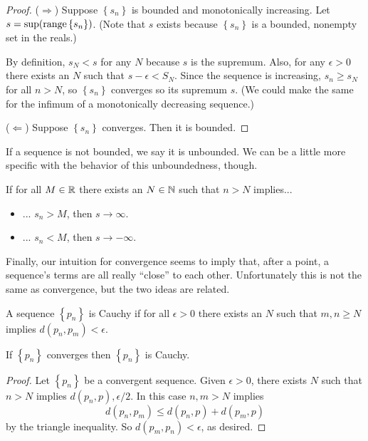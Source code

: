 \documentclass[../m131main.tex]{subfiles}
\begin{document}
\begin{proof}
    ($\Rightarrow$) Suppose $\left\{ s_n \right\}$ is bounded and monotonically increasing.
    Let $s = \sup (\operatorname{range} \left\{ s_n \right\})$.
    (Note that $s$ exists because $\left\{ s_n \right\}$ is a bounded, nonempty set in the reals.)

    By definition, $s_N < s$ for any $N$ because $s$ is the supremum.
    Also, for any $\epsilon > 0$ there exists an $N$ such that $s - \epsilon < S_N$.
    Since the sequence is increasing, $s_n \geq s_N$ for all $n > N$, so $\left\{ s_n \right\}$ converges so its supremum $s$.
    (We could make the same for the infimum of a monotonically decreasing sequence.)

    ($\Leftarrow$) Suppose $\left\{ s_n \right\}$ converges.
    Then it is bounded.
\end{proof}

If a sequence is not bounded, we say it is unbounded.
We can be a little more specific with the behavior of this unboundedness, though.

\begin{definition}
    If for all $M \in \mathbb{R}$ there exists an $N \in \mathbb{N}$ such that $n > N$ implies...
    \begin{itemize}
        \item ... $s_n > M$, then $s \to \infty$.
        \item ... $s_n < M$, then $s \to -\infty$.
    \end{itemize}
\end{definition}

Finally, our intuition for convergence seems to imply that, after a point, a sequence's terms are all really ``close'' to each other.
Unfortunately this is not the same as convergence, but the two ideas are related.

\begin{definition}
    A sequence $\left\{ p_n \right\}$ is Cauchy if for all $\epsilon > 0$ there exists an $N$ such that $m,n \geq N$ implies $d(p_n, p_m) < \epsilon$.
\end{definition}

\begin{theorem}[]
    If $\left\{ p_n \right\}$ converges then $\left\{ p_n \right\}$ is Cauchy.
\end{theorem}

\begin{proof}
    Let $\left\{ p_n \right\}$ be a convergent sequence.
    Given $\epsilon > 0$, there exists $N$ such that $n > N$ implies $d(p_n, p) , \epsilon / 2$.
    In this case $n,m > N$ implies
    \[ d(p_n, p_m) \leq d(p_n, p) + d(p_m, p) \]
    by the triangle inequality.
    So $d(p_m, p_n) < \epsilon$, as desired.
\end{proof}
\end{document}
